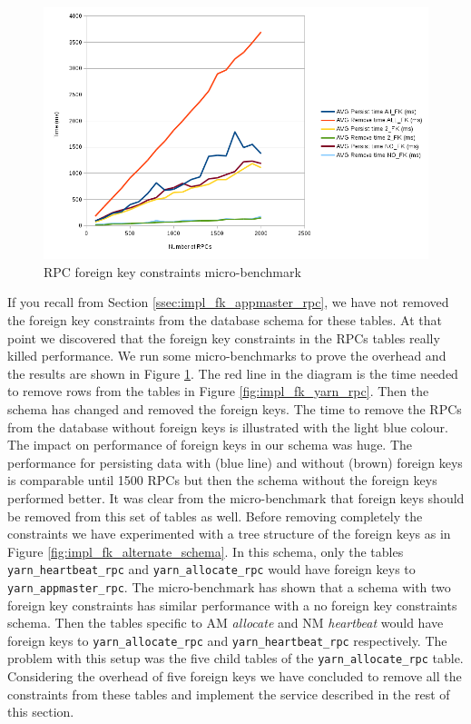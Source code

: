 \begin{figure}
\centering
\includegraphics[scale=0.7]{resources/images/Implementation/rpc_fk_overhead.png}
\caption{RPC foreign key constraints micro-benchmark}
\label{fig:impl_fk_overhead}
\end{figure}

If you recall from Section \ref{ssec:impl_fk_appmaster_rpc}, we have
not removed the foreign key constraints from the database schema for
these tables. At that point we discovered that the foreign
key constraints in the RPCs tables really killed performance. We run
some micro-benchmarks to prove the overhead and the results are shown in
Figure \ref{fig:impl_fk_overhead}. The red line in the diagram is the
time needed to remove rows from the tables in Figure
\ref{fig:impl_fk_yarn_rpc}. Then the schema has changed and removed
the foreign keys. The time to remove the RPCs from the database
without foreign keys is illustrated with the light blue colour. The impact
on performance of foreign keys in our schema was huge. The performance
for persisting data with (blue line) and without (brown) foreign keys
is comparable until 1500 RPCs but then the schema without the foreign
keys performed better. It was clear from the micro-benchmark that
foreign keys should be removed from this set of tables as well. Before
removing completely the constraints we have experimented with a tree
structure of the foreign keys as in Figure
\ref{fig:impl_fk_alternate_schema}. In this schema, only the tables
\texttt{yarn\_heartbeat\_rpc} and \texttt{yarn\_allocate\_rpc} would
have foreign keys to \texttt{yarn\_appmaster\_rpc}. The
micro-benchmark has shown that a schema with two foreign key
constraints has similar performance with a no foreign key constraints
schema. Then the tables specific to AM \emph{allocate} and NM
\emph{heartbeat} would have foreign keys to
\texttt{yarn\_allocate\_rpc} and \texttt{yarn\_heartbeat\_rpc}
respectively. The problem with this setup was the five child tables
of the \texttt{yarn\_allocate\_rpc} table. Considering the overhead of
five foreign keys we have concluded
to remove all the constraints from these tables and implement the
service described in the rest of this section.

